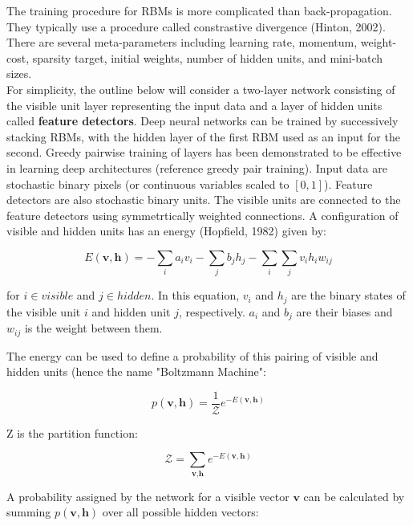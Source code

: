 The training procedure for RBMs is more complicated than back-propagation. They typically use a procedure called constrastive divergence (Hinton, 2002). There are several meta-parameters including learning rate, momentum, weight-cost, sparsity target, initial weights, number of hidden units, and mini-batch sizes. \\

For simplicity, the outline below will consider a two-layer network consisting of the visible unit layer representing the input data and a layer of hidden units called \textbf{feature detectors}. Deep neural networks can be trained by successively stacking RBMs, with the hidden layer of the first RBM used as an input for the second. Greedy pairwise training of layers has been demonstrated to be effective in learning deep architectures (reference greedy pair training). Input data are stochastic binary pixels (or continuous variables scaled to $[0,1]$). Feature detectors are also stochastic binary units. The visible units are connected to the feature detectors using symmetrtically weighted connections. A configuration of visible and hidden units has an energy (Hopfield, 1982) given by:

\begin{equation}
E(\textbf{v},\textbf{h}) = - \sum_{i} a_{i} v_{i} -\sum_{j} b_{j} h_{j} - \sum_{i}\sum_{j}v_{i}h_{i}w_{ij}
\end{equation}

for $i \in visible$ and $j \in hidden$. In this equation, $v_{i}$ and $h_{j}$ are the binary states of the visible unit $i$ and hidden unit $j$, respectively. $a_{i}$ and $b_{j}$ are their biases and $w_{ij}$ is the weight between them. 

The energy can be used to define a probability of this pairing of visible and hidden units (hence the name "Boltzmann Machine":

\begin{equation}
p(\textbf{v},\textbf{h}) = \frac{1}{\mathcal{Z}} e^{-E(\textbf{v},\textbf{h})}
\end{equation}

Z is the partition function:

\begin{equation}
\mathcal{Z} = \sum_{\textbf{v},\textbf{h}} e^{-E(\textbf{v},\textbf{h})}
\end{equation}

A probability assigned by the network for a visible vector $\textbf{v}$ can be calculated by summing $p(\textbf{v},\textbf{h})$ over all possible hidden vectors:

